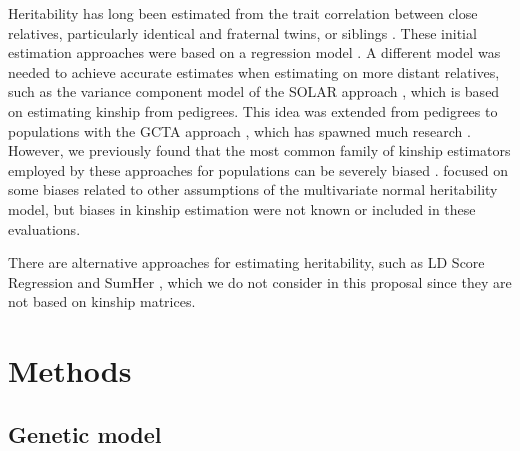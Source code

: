 \documentclass[11pt]{article}
\begin{document}
Heritability has long been estimated from the trait correlation between close relatives, particularly identical and fraternal twins, or siblings \citep{falconer_introduction_1996}.
These initial estimation approaches were based on a regression model \citep{falconer_introduction_1996}.
A different model was needed to achieve accurate estimates when estimating on more distant relatives, such as the variance component model of the SOLAR approach \citep{almasy_multipoint_1998}, which is based on estimating kinship from pedigrees.
This idea was extended from pedigrees to populations with the GCTA approach \citep{yang_common_2010, yang_gcta:_2011}, which has spawned much research \citep{visscher_commentary_2010, speed_improved_2012, krishna_kumar_limitations_2016, yang_gcta-greml_2016, jiang_high-dimensional_2016}.
However, we previously found that the most common family of kinship estimators employed by these approaches for populations can be severely biased \citep{ochoa_fst2}.
\citet{speed_improved_2012} focused on some biases related to other assumptions of the multivariate normal heritability model, but biases in kinship estimation were not known or included in these evaluations.

There are alternative approaches for estimating heritability, such as LD Score Regression \citep{bulik-sullivan_ld_2015} and SumHer \citep{speed_sumher_2019}, which we do not consider in this proposal since they are not based on kinship matrices.


\section{Methods}

\subsection{Genetic model}
\end{document}
